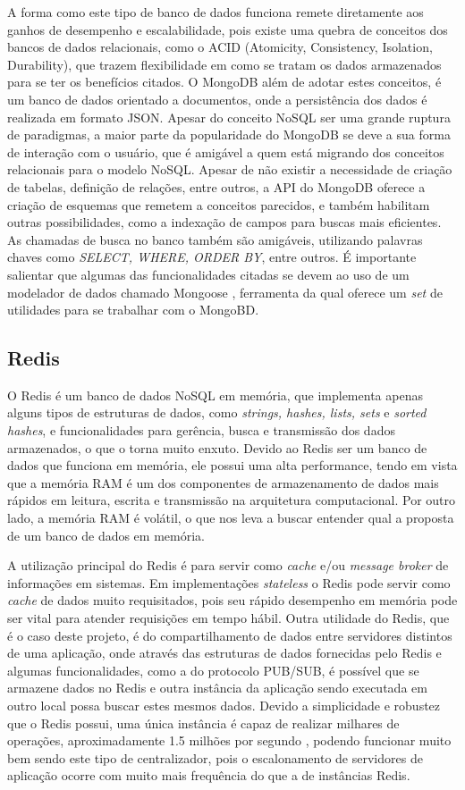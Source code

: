 A forma como este tipo de banco de dados funciona remete diretamente aos ganhos de desempenho e escalabilidade, pois existe uma quebra de conceitos dos bancos de dados relacionais, como o ACID (Atomicity, Consistency, Isolation, Durability), que trazem flexibilidade em como se tratam os dados armazenados para se ter os benefícios citados. O MongoDB além de adotar estes conceitos, é um banco de dados orientado a documentos, onde a persistência dos dados é realizada em formato JSON. Apesar do conceito NoSQL ser uma grande ruptura de paradigmas, a maior parte da popularidade do MongoDB se deve a sua forma de interação com o usuário, que é amigável a quem está migrando dos conceitos relacionais para o modelo NoSQL. Apesar de não existir a necessidade de criação de tabelas, definição de relações, entre outros, a API do MongoDB oferece a criação de esquemas que remetem a conceitos parecidos, e também habilitam outras possibilidades, como a indexação de campos para buscas mais eficientes. As chamadas de busca no banco também são amigáveis, utilizando palavras chaves como \textit{SELECT, WHERE, ORDER BY}, entre outros. É importante salientar que algumas das funcionalidades citadas se devem ao uso de um modelador de dados chamado Mongoose \cite{mongoose}, ferramenta da qual oferece um \textit{set} de utilidades para se trabalhar com o MongoBD.
 
\subsection{Redis}
O Redis é um banco de dados NoSQL em memória, que implementa apenas alguns tipos de estruturas de dados, como \textit{strings, hashes, lists, sets} e \textit{sorted hashes}, e funcionalidades para gerência, busca e transmissão dos dados armazenados, o que o torna muito enxuto. Devido ao Redis ser um banco de dados que funciona em memória, ele possui uma alta performance, tendo em vista que a memória RAM é um dos componentes de armazenamento de dados mais rápidos em leitura, escrita e transmissão na arquitetura computacional. Por outro lado, a memória RAM é volátil, o que nos leva a buscar entender qual a proposta de um banco de dados em memória.

A utilização principal do Redis é para servir como \textit{cache} e/ou \textit{message broker} de informações em sistemas. Em implementações \textit{stateless} o Redis pode servir como \textit{cache} de dados muito requisitados, pois seu rápido desempenho em memória pode ser vital para atender requisições em tempo hábil. Outra utilidade do Redis, que é o caso deste projeto, é do compartilhamento de dados entre servidores distintos de uma aplicação, onde através das estruturas de dados fornecidas pelo Redis e algumas funcionalidades, como a do protocolo PUB/SUB, é possível que se armazene dados no Redis e outra instância da aplicação sendo executada em outro local possa buscar estes mesmos dados. Devido a simplicidade e robustez que o Redis possui, uma única instância é capaz de realizar milhares de operações, aproximadamente 1.5 milhões por segundo \cite{redis-metrics}, podendo funcionar muito bem sendo este tipo de centralizador, pois o escalonamento de servidores de aplicação ocorre com muito mais frequência do que a de instâncias Redis. 

